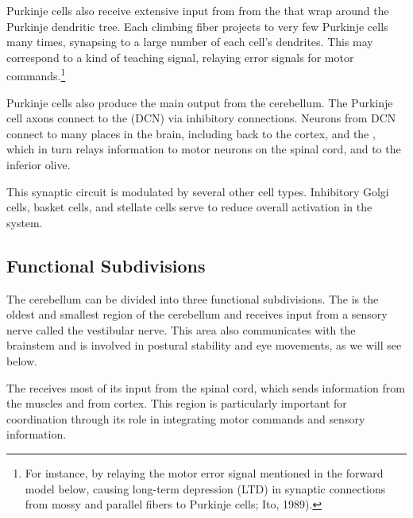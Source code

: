 Purkinje cells also receive extensive input from  from the  that wrap around the Purkinje dendritic tree. Each climbing fiber projects to very few Purkinje cells many times, synapsing to a large number of each cell's dendrites. This may correspond to a kind of teaching signal, relaying error signals for motor commands.\footnote{For instance, by relaying the motor error signal mentioned in the forward model below, causing long-term depression (LTD) in synaptic connections from mossy and parallel fibers to Purkinje cells; Ito, 1989).}
 

Purkinje cells also produce the main output from the cerebellum. The Purkinje cell axons connect to the  (DCN) via inhibitory connections. Neurons from DCN connect to many places in the brain, including back to the cortex, and the , which in turn relays information to motor neurons on the spinal cord, and to the inferior olive.

This synaptic circuit is modulated by several other cell types. Inhibitory Golgi cells, basket cells, and stellate cells serve to reduce overall activation in the system.


 
\subsection{Functional Subdivisions}
 
The cerebellum can be divided into three functional subdivisions. The  is the oldest and smallest region of the cerebellum and receives input from a sensory nerve called the vestibular nerve. This area also communicates with the brainstem and is involved in postural stability and eye movements, as we will see below. 

The   receives most of its input from the spinal cord, which sends information from the muscles and from cortex. This region is particularly important for coordination through its role in integrating motor commands and sensory information. 

